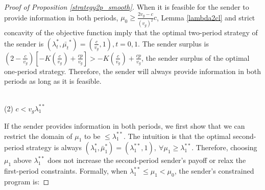 \documentclass[11pt]{extarticle}
\begin{document}
\begin{proof}[Proof of Proposition \ref{strategy2p_smooth}]
	When it is feasible for the sender to provide information in both periods, $\mu_0 \geq \frac{2v_g-c}{(v_g)^2} c$, Lemma \ref{lambda2cl} and strict concavity of the objective function imply that the optimal two-period strategy of the sender is  $(\lambda_t^*,\bar{\mu_t}^*)=(\frac{c}{v_g},1),t=0,1$. The sender surplus is $(2-\frac{c}{v_g}) \left[-K(\frac{c}{v_g})+\frac{cp}{v_g}\right] > -K(\frac{c}{v_g})+\frac{cp}{v_g}$, the sender surplus of the optimal one-period strategy. Therefore, the sender will always provide information in both periods as long as it is feasible.
	
	~\\(2) $c < v_g\lambda_1^{**}$
	
	If the sender provides information in both periods, we first show that we can restrict the domain of $\mu_1$ to be $\leq \lambda_1^{**}$. The intuition is that the optimal second-period strategy is always $(\lambda_1^*,\bar{\mu}_1^*)=(\lambda_1^{**},1),~ \forall \mu_1 \geq \lambda_1^{**}$. Therefore, choosing $\mu_1$ above $\lambda_1^{**}$ does not increase the second-period sender's payoff or relax the first-period constraints. Formally, when $\lambda_1^{**} \leq \mu_1 < \mu_0$, the sender's constrained program is:
	

\end{proof}
\end{document}
